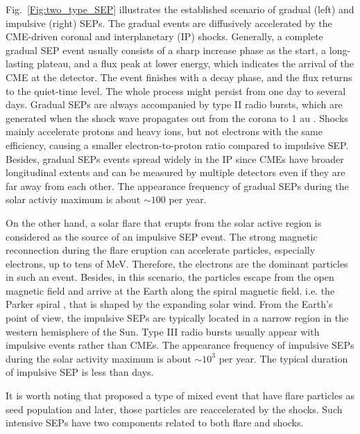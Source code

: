 Fig.~\ref{Fig:two_type_SEP} illustrates the established scenario of gradual (left) and impulsive (right) \acp{SEP}.
The gradual events are diffusively accelerated by the \ac{CME}-driven coronal and interplanetary (IP) shocks. Generally, a complete gradual \ac{SEP} event usually consists of a sharp increase phase as the start, a long-lasting plateau, and a flux peak at lower energy, which indicates the arrival of the \ac{CME} at the detector. The event finishes with a decay phase, and the flux returns to the quiet-time level. The whole process might persist from one day to several days. Gradual \acp{SEP} are always accompanied by type II radio bursts, which are generated when the shock wave propagates out from the corona to 1 au \citep{Gopalswamy2006GMS}.
Shocks mainly accelerate protons and heavy ions, but not electrons with the same efficiency, causing a smaller electron-to-proton ratio compared to impulsive \ac{SEP}. Besides, gradual \acp{SEP} events spread widely in the IP since \acp{CME} have broader longitudinal extents and can be measured by multiple detectors even if they are far away from each other. 
The appearance frequency of gradual \acp{SEP} during the solar activiy maximum is about $\sim 100$ per year.

On the other hand, a solar flare that erupts from the solar active region is considered as the source of an impulsive \ac{SEP} event. The strong magnetic reconnection during the flare eruption can accelerate particles, especially electrons, up to tens of MeV. Therefore, the electrons are the dominant particles in such an event. Besides, in this scenario, the particles escape from the open magnetic field and arrive at the Earth along the spiral magnetic field. i.e. the Parker spiral \citep{Parker-1958}, that is shaped by the expanding solar wind. From the Earth's point of view, the impulsive \acp{SEP} are typically located in a narrow region in the western hemisphere of the Sun. Type III radio bursts usually appear with impulsive events rather than \acp{CME}.
The appearance frequency of impulsive \acp{SEP} during the solar activity maximum is about $\sim 10^3$ per year. The typical duration of impulsive \ac{SEP} is less than days.

It is worth noting that \citet{cane2003two} proposed a type of mixed event that have flare particles as seed population and later, those particles are reaccelerated by the shocks. Such intensive \acp{SEP} have two components related to both flare and shocks. 


